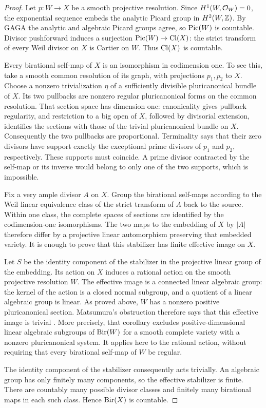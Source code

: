 \begin{proof}
Let \(p:W\to X\) be a smooth projective resolution. Since
\(H^1(W,\mathcal O_W)=0\), the exponential sequence embeds the analytic
Picard group in \(H^2(W,\mathbb Z)\). By GAGA the analytic and algebraic
Picard groups agree, so \(\operatorname{Pic}(W)\) is countable. Divisor pushforward
induces a surjection \(\operatorname{Pic}(W)\to\operatorname{Cl}(X)\): the strict transform of
every Weil divisor on \(X\) is Cartier on \(W\). Thus \(\operatorname{Cl}(X)\)
is countable.

Every birational self-map of \(X\) is an isomorphism in codimension
one.  To see this, take a smooth common resolution of its graph, with
projections \(p_1,p_2\) to \(X\).  Choose a nonzero trivialization
\(\eta\) of a sufficiently divisible pluricanonical bundle of
\(X\).  Its two pullbacks are nonzero regular pluricanonical forms
on the common resolution.  That section space has dimension one:
canonicality gives pullback regularity, and restriction to a big open
of \(X\), followed by divisorial extension, identifies the sections
with those of the trivial pluricanonical bundle on \(X\).
Consequently the two pullbacks are proportional.  Terminality says
that their zero divisors have support exactly the exceptional prime
divisors of \(p_1\) and \(p_2\), respectively.  These supports must
coincide.  A prime divisor contracted by the self-map or its inverse
would belong to only one of the two supports, which is impossible.

Fix a very ample divisor \(A\) on \(X\).  Group the birational
self-maps according to the Weil linear equivalence class of the strict
transform of \(A\) back to the source.  Within one class, the
complete spaces of sections are identified by the codimension-one
isomorphisms.  The two maps to the embedding of \(X\) by \(|A|\)
therefore differ by a projective linear automorphism preserving that
embedded variety.  It is enough to prove that this stabilizer has
finite effective image on \(X\).

Let $S$ be the identity component of the stabilizer in the projective
linear group of the embedding. Its action on $X$ induces a rational
action on the smooth projective resolution $W$. The effective image is
a connected linear algebraic group: the kernel of the action is a closed
normal subgroup, and a quotient of a linear algebraic group is linear.
As proved above, $W$ has a nonzero positive pluricanonical section.
Matsumura's obstruction therefore says that this effective image is
trivial \cite[Corollary~1]{Matsumura1963}. More precisely, that corollary
excludes positive-dimensional linear algebraic subgroups of $\operatorname{Bir}(W)$
for a smooth complete variety with a nonzero pluricanonical system.
It applies here to the rational action, without requiring that every
birational self-map of $W$ be regular.

The identity component of the stabilizer consequently acts trivially.
An algebraic group has only finitely many components, so the effective
stabilizer is finite.  There are countably many possible divisor
classes and finitely many birational maps in each such class.  Hence
\(\operatorname{Bir}(X)\) is countable.
\end{proof}
